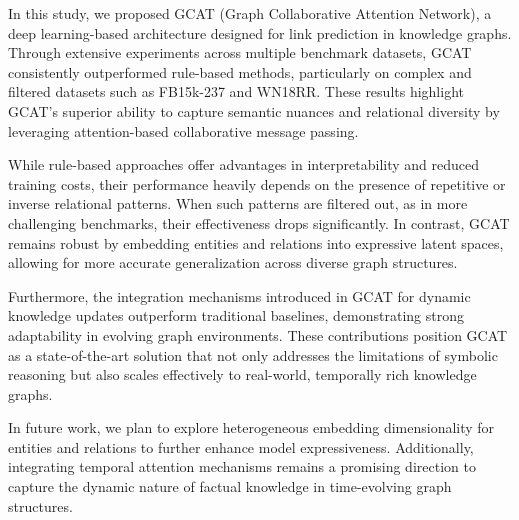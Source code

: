 

In this study, we proposed GCAT (Graph Collaborative Attention Network), a deep learning-based architecture designed for link prediction in knowledge graphs. Through extensive experiments across multiple benchmark datasets, GCAT consistently outperformed rule-based methods, particularly on complex and filtered datasets such as FB15k-237 and WN18RR. These results highlight GCAT’s superior ability to capture semantic nuances and relational diversity by leveraging attention-based collaborative message passing.

While rule-based approaches offer advantages in interpretability and reduced training costs, their performance heavily depends on the presence of repetitive or inverse relational patterns. When such patterns are filtered out, as in more challenging benchmarks, their effectiveness drops significantly. In contrast, GCAT remains robust by embedding entities and relations into expressive latent spaces, allowing for more accurate generalization across diverse graph structures.

Furthermore, the integration mechanisms introduced in GCAT for dynamic knowledge updates outperform traditional baselines, demonstrating strong adaptability in evolving graph environments. These contributions position GCAT as a state-of-the-art solution that not only addresses the limitations of symbolic reasoning but also scales effectively to real-world, temporally rich knowledge graphs.

In future work, we plan to explore heterogeneous embedding dimensionality for entities and relations to further enhance model expressiveness. Additionally, integrating temporal attention mechanisms remains a promising direction to capture the dynamic nature of factual knowledge in time-evolving graph structures.
